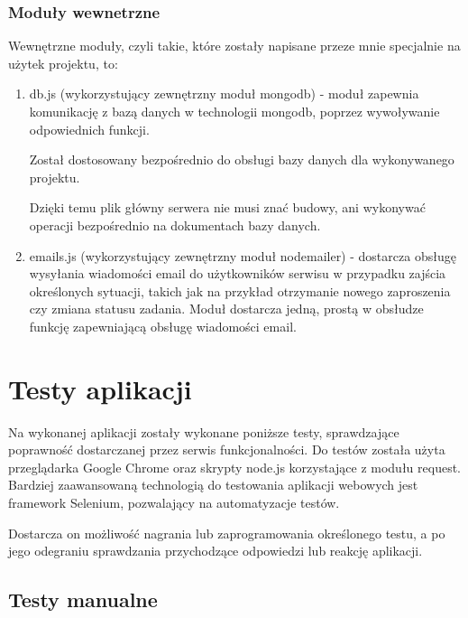 \documentclass[12pt]{report}
\begin{document}
\subsection{Moduły wewnetrzne}
Wewnętrzne moduły, czyli takie, które zostały napisane przeze mnie specjalnie na użytek projektu, to:
\begin{enumerate}
\item db.js (wykorzystujący zewnętrzny moduł mongodb) - moduł zapewnia komunikację z bazą danych w technologii mongodb, poprzez wywoływanie odpowiednich funkcji.

Został dostosowany bezpośrednio do obsługi bazy danych dla wykonywanego projektu.

Dzięki temu plik główny serwera nie musi znać budowy, ani wykonywać operacji bezpośrednio na dokumentach bazy danych.
\item emails.js (wykorzystujący zewnętrzny moduł nodemailer) - dostarcza obsługę wysyłania wiadomości email do użytkowników serwisu w przypadku zajścia określonych sytuacji, takich jak na przykład otrzymanie nowego zaproszenia czy zmiana statusu zadania.
Moduł dostarcza jedną, prostą w obsłudze funkcję zapewniającą obsługę wiadomości email.

\end{enumerate}


\chapter{Testy aplikacji}
Na wykonanej aplikacji zostały wykonane poniższe testy, sprawdzające poprawność dostarczanej przez serwis funkcjonalności.
Do testów została użyta przeglądarka Google Chrome oraz skrypty node.js korzystające z modułu request.
Bardziej zaawansowaną technologią do testowania aplikacji webowych jest framework Selenium, pozwalający na automatyzacje testów.

Dostarcza on możliwość nagrania lub zaprogramowania określonego testu, a po jego odegraniu sprawdzania przychodzące odpowiedzi lub reakcję aplikacji.

\newpage
\section{Testy manualne}
\end{document}

